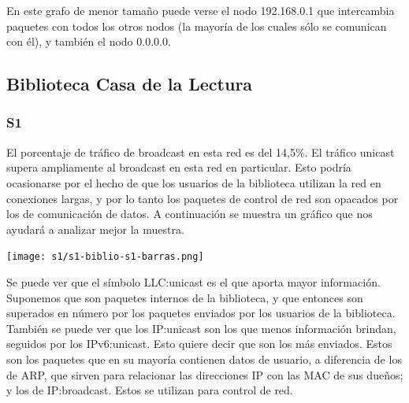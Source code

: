 En este grafo de menor tamaño puede verse el nodo 192.168.0.1 que
intercambia paquetes con todos los otros nodos (la mayoría de los
cuales sólo se comunican con él), y también el nodo 0.0.0.0.

\subsection{Biblioteca Casa de la Lectura}
\subsubsection{S1}

El porcentaje de tráfico de broadcast en esta red es del 14,5\%. El tráfico unicast supera ampliamente
al broadcast en esta red en particular. Esto podría ocasionarse por el hecho de que los
usuarios de la biblioteca utilizan la red en conexiones largas, y por lo tanto los paquetes
de control de red son opacados por los de comunicación de datos. A continuación se muestra un
gráfico que nos ayudará a analizar mejor la muestra.

\begin{center}
\texttt{[image: s1/s1-biblio-s1-barras.png]}
\end{center}



Se puede ver que el símbolo LLC:unicast es el que aporta mayor información.
Suponemos que son paquetes internos de la biblioteca, y que entonces son
superados en número por los paquetes enviados por los usuarios de la biblioteca.
También se puede ver que los IP:unicast son los que menos información brindan,
seguidos por los IPv6:unicast. Esto quiere decir que son los más enviados.
Estos son los paquetes que en su mayoría contienen datos de usuario,
a diferencia de los de ARP, que sirven para relacionar las direcciones IP con
las MAC de sus dueños; y los de IP:broadcast. Estos se utilizan para control de red.



